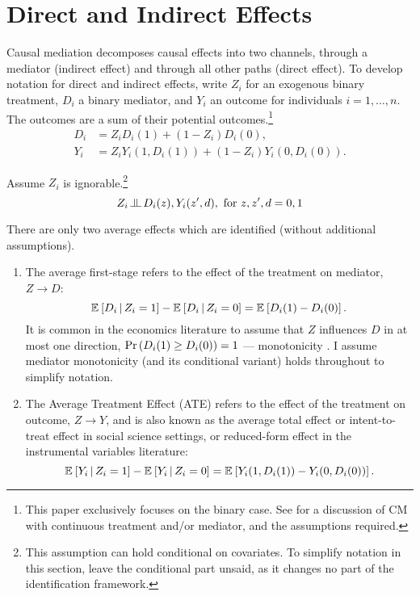 \section{Direct and Indirect Effects}
\label{sec:mediation}
Causal mediation decomposes causal effects into two channels, through a mediator (indirect effect) and through all other paths (direct effect).
To develop notation for direct and indirect effects, write $Z_i$ for an exogenous binary treatment, $D_i$ a binary mediator, and $Y_i$ an outcome for individuals $i = 1, \hdots, n$.
The outcomes are a sum of their potential outcomes.\footnote{
    This paper exclusively focuses on the binary case.
    See \cite{huber2020direct} for a discussion of CM with continuous treatment and/or mediator, and the assumptions required.
}
\begin{align*}
    D_i &= Z_i       D_i(1)
        + (1 - Z_i) D_i(0),  \\
    Y_i &= Z_i       Y_i(1, D_i(1))
        + (1 - Z_i) Y_i(0, D_i(0)).
\end{align*}

Assume $Z_i$ is ignorable.\footnote{
    This assumption can hold conditional on covariates.
    To simplify notation in this section, leave the conditional part unsaid, as it changes no part of the identification framework.
}
\[ Z_i \indep  D_i(z), Y_i(z', d), \text{ for } z, z', d = 0, 1 \]

There are only two average effects which are identified (without additional assumptions).
\begin{enumerate}
    \item The average first-stage refers to the effect of the treatment on mediator, $Z \to D$:
    \[ \mathbb{E}_{} \left[ D_i \, \middle\vert \, Z_i = 1 \right] - \mathbb{E}_{} \left[ D_i \, \middle\vert \, Z_i = 0 \right]
        = \mathbb{E}_{} \left[ D_i(1) - D_i(0) \right]. \]
    It is common in the economics literature to assume that $Z$ influences $D$ in at most one direction, $\Pr\left( D_i(1) \geq D_i(0) \right) = 1$ --- monotonicity \citep{imbens1994identification}.
    I assume mediator monotonicity (and its conditional variant) holds throughout to simplify notation.
    \item The Average Treatment Effect (ATE) refers to the effect of the treatment on outcome, $Z \to Y$, and is also known as the average total effect or intent-to-treat effect in social science settings, or reduced-form effect in the instrumental variables literature:
    \[ \mathbb{E}_{} \left[ Y_i \, \middle\vert \, Z_i = 1 \right] - \mathbb{E}_{} \left[ Y_i \, \middle\vert \, Z_i = 0 \right]
        = \mathbb{E}_{} \left[ Y_i(1, D_i(1)) - Y_i(0, D_i(0)) \right]. \]
\end{enumerate}

